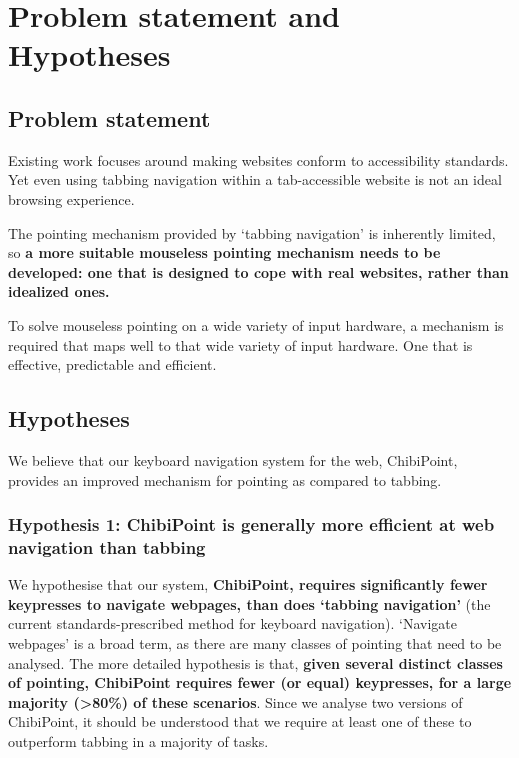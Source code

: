 \documentclass[11pt,openright,a4paper]{report}
\begin{document}
\section{Problem statement and Hypotheses}
\subsection{Problem statement}
Existing work focuses around making websites conform to accessibility standards. Yet even using tabbing navigation within a tab-accessible website is not an ideal browsing experience.

The pointing mechanism provided by `tabbing navigation' is inherently limited, so \textbf{a more suitable mouseless pointing mechanism needs to be developed: one that is designed to cope with real websites, rather than idealized ones.}

To solve mouseless pointing on a wide variety of input hardware, a mechanism is required that maps well to that wide variety of input hardware. One that is effective, predictable and efficient.

\subsection{Hypotheses}
\label{chap:hypotheses}
We believe that our keyboard navigation system for the web, ChibiPoint, provides an improved mechanism for pointing as compared to tabbing.

\newcommand{\hypone}{Hypothesis 1: ChibiPoint is generally more efficient at web navigation than tabbing}
\subsubsection{\hypone}
We hypothesise that our system, \textbf{ChibiPoint, requires significantly fewer keypresses to navigate webpages, than does `tabbing navigation'} (the current standards-prescribed method for keyboard navigation).
`Navigate webpages' is a broad term, as there are many classes of pointing that need to be analysed. The more detailed hypothesis is that, \textbf{given several distinct classes of pointing, ChibiPoint requires fewer (or equal) keypresses, for a large majority (>80\%) of these scenarios}. Since we analyse two versions of ChibiPoint, it should be understood that we require at least one of these to outperform tabbing in a majority of tasks.
\end{document}
